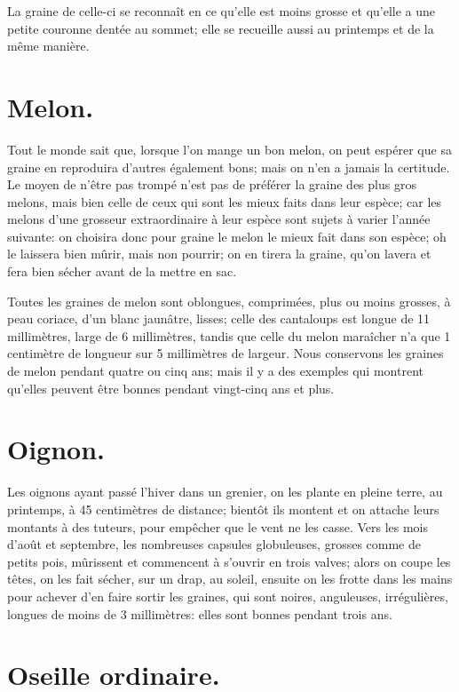 \documentclass[10pt,a4paper]{book}
\begin{document}
La graine de celle-ci se reconnaît en ce qu'elle est moins grosse et qu'elle a une petite couronne dentée au sommet; elle se recueille aussi au printemps et de la même manière.

\section{Melon.}

Tout le monde sait que, lorsque l'on mange un bon melon, on peut espérer que sa graine en reproduira d'autres également bons; mais on n'en a jamais la certitude. Le moyen de n'être pas trompé n'est pas de préférer la graine des plus gros melons, mais bien celle de ceux qui sont les mieux faits dans leur espèce; car les melons d'une grosseur extraordinaire à leur espèce sont sujets à varier l'année suivante: on choisira donc pour graine le melon le mieux fait dans son espèce; oh le laissera bien mûrir, mais non pourrir; on en tirera la graine, qu'on lavera et fera bien sécher avant de la mettre en sac.

Toutes les graines de melon sont oblongues, comprimées, plus ou moins grosses, à peau coriace, d'un blanc jaunâtre, lisses; celle des cantaloups est longue de 11 millimètres, large de 6 millimètres, tandis que celle du melon maraîcher n'a que 1 centimètre de longueur sur 5 millimètres de largeur. Nous conservons les graines de melon pendant quatre ou cinq ans; mais il y a des exemples qui montrent qu'elles peuvent être bonnes pendant vingt-cinq ans et plus.

\section{Oignon.}

Les oignons ayant passé l'hiver dans un grenier, on les plante en pleine terre, au printemps, à 45 centimètres de distance; bientôt ils montent et on attache leurs montants à des tuteurs, pour empêcher que le vent ne les casse. Vers les mois d'août et septembre, les nombreuses capsules globuleuses, grosses comme de petits pois, mûrissent et commencent à s'ouvrir en trois valves; alors on coupe les têtes, on les fait sécher, sur un drap, au soleil, ensuite on les frotte dans les mains pour achever d'en faire sortir les graines, qui sont noires, anguleuses, irrégulières, longues de moins de 3 millimètres: elles sont bonnes pendant trois ans.

\section{Oseille ordinaire.}
\end{document}
